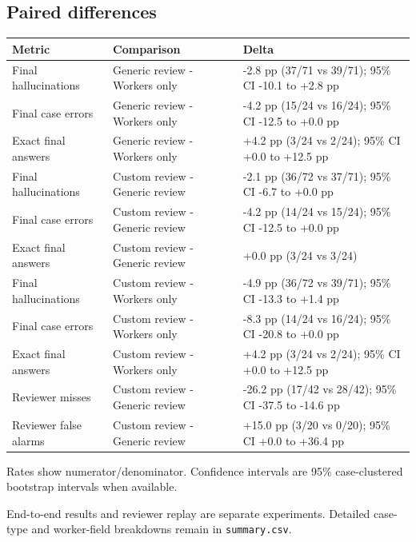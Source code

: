 \documentclass{article}
\begin{document}
\subsection*{Paired differences}
\begin{center}
\small
\begin{tabularx}{\linewidth}{lXX}
\toprule
Metric & Comparison & Delta \\
\midrule
Final hallucinations & Generic review - Workers only & -2.8 pp (37/71 vs 39/71); 95\% CI -10.1 to +2.8 pp \\
Final case errors & Generic review - Workers only & -4.2 pp (15/24 vs 16/24); 95\% CI -12.5 to +0.0 pp \\
Exact final answers & Generic review - Workers only & +4.2 pp (3/24 vs 2/24); 95\% CI +0.0 to +12.5 pp \\
Final hallucinations & Custom review - Generic review & -2.1 pp (36/72 vs 37/71); 95\% CI -6.7 to +0.0 pp \\
Final case errors & Custom review - Generic review & -4.2 pp (14/24 vs 15/24); 95\% CI -12.5 to +0.0 pp \\
Exact final answers & Custom review - Generic review & +0.0 pp (3/24 vs 3/24) \\
Final hallucinations & Custom review - Workers only & -4.9 pp (36/72 vs 39/71); 95\% CI -13.3 to +1.4 pp \\
Final case errors & Custom review - Workers only & -8.3 pp (14/24 vs 16/24); 95\% CI -20.8 to +0.0 pp \\
Exact final answers & Custom review - Workers only & +4.2 pp (3/24 vs 2/24); 95\% CI +0.0 to +12.5 pp \\
Reviewer misses & Custom review - Generic review & -26.2 pp (17/42 vs 28/42); 95\% CI -37.5 to -14.6 pp \\
Reviewer false alarms & Custom review - Generic review & +15.0 pp (3/20 vs 0/20); 95\% CI +0.0 to +36.4 pp \\
\bottomrule
\end{tabularx}
\end{center}
\noindent Rates show numerator/denominator. Confidence intervals are 95\% case-clustered bootstrap intervals when available.
\par End-to-end results and reviewer replay are separate experiments. Detailed case-type and worker-field breakdowns remain in \texttt{summary.csv}.
\end{document}
